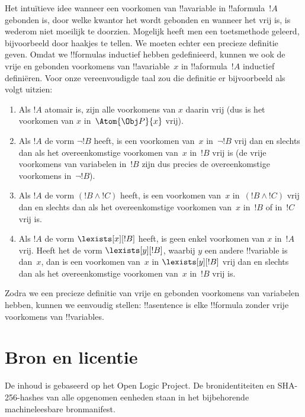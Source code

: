 \documentclass[openany]{memoir}
\begin{document}
Het intuïtieve idee wanneer een voorkomen van !!a{variable} in
!!a{formula}~$!A$ gebonden is, door welke kwantor het wordt gebonden en
wanneer het vrij is, is wederom niet moeilijk te doorzien. Mogelijk
heeft men een toetsmethode geleerd, bijvoorbeeld door haakjes te
tellen. We moeten echter een precieze definitie geven. Omdat we
!!{formula}s inductief hebben gedefinieerd, kunnen we ook de vrije en
gebonden voorkomens van !!a{variable}~$x$ in !!a{formula}~$!A$
inductief definiëren. Voor onze vereenvoudigde taal zou die definitie
er bijvoorbeeld als volgt uitzien:
\begin{enumerate}
  \item Als $!A$ atomair is, zijn alle voorkomens van $x$ daarin vrij
  (dus is het voorkomen van $x$ in~$\Atom{\Obj P}{x}$ vrij).
  \item Als $!A$ de vorm $\lnot !B$ heeft, is een voorkomen van~$x$
  in~$\lnot !B$ vrij dan en slechts dan als het overeenkomstige
  voorkomen van~$x$ in~$!B$ vrij is (de vrije voorkomens van variabelen
  in~$!B$ zijn dus precies de overeenkomstige voorkomens in~$\lnot !B$).
  \item Als $!A$ de vorm $(!B \land !C)$ heeft, is een voorkomen van~$x$
  in~$(!B \land !C)$ vrij dan en slechts dan als het overeenkomstige
  voorkomen van~$x$ in~$!B$ of in~$!C$ vrij is.
  \item Als $!A$ de vorm $\lexists[x][!B]$ heeft, is geen enkel voorkomen
  van $x$ in~$!A$ vrij. Heeft het de vorm $\lexists[y][!B]$, waarbij
  $y$ een andere !!{variable} is dan~$x$, dan is een voorkomen van~$x$
  in $\lexists[y][!B]$ vrij dan en slechts dan als het overeenkomstige
  voorkomen van~$x$ in~$!B$ vrij is.
\end{enumerate}

Zodra we een precieze definitie van vrije en gebonden voorkomens van
variabelen hebben, kunnen we eenvoudig stellen: !!a{sentence} is elke
!!{formula} zonder vrije voorkomens van !!{variable}s.
\endgroup
\OLEndChapterHook
\OLEndPartHook

\clearpage
\chapter*{Bron en licentie}
De inhoud is gebaseerd op het Open Logic Project. De bronidentiteiten en
SHA-256-hashes van alle opgenomen eenheden staan in het bijbehorende
machineleesbare bronmanifest.


\end{document}
